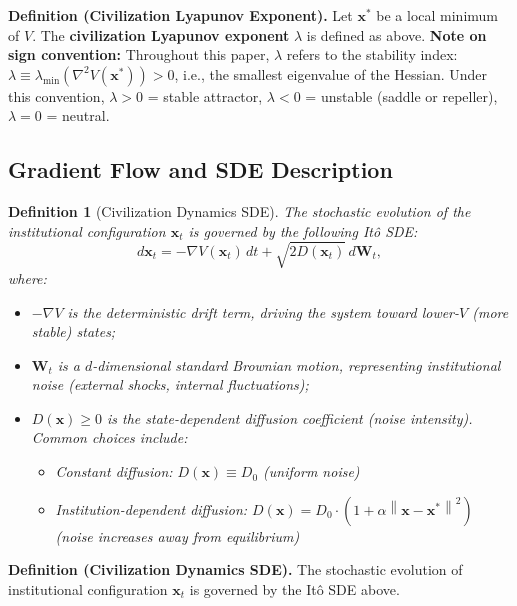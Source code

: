 \documentclass[12pt,a4paper]{article}
\newtheorem{definition}[theorem]{Definition}
\theoremstyle{definition}
\newcommand{\norm}[1]{\left\|#1\right\|}
\newcommand{\lb}{\lambda}
\newcommand{\lambdamin}{\lambda_{\min}}
\newcommand{\Lyap}{V}
\newcommand{\grad}{\nabla}
\begin{document}
\noindent
\textbf{Definition (Civilization Lyapunov Exponent).}
Let $\mathbf{x}^*$ be a local minimum of $\Lyap$. The \textbf{civilization Lyapunov exponent} $\lb$ is defined as above. \textbf{Note on sign convention:} Throughout this paper, $\lb$ refers to the stability index: $\lb \equiv \lambdamin(\nabla^2 \Lyap(\mathbf{x}^*)) > 0$, i.e., the smallest eigenvalue of the Hessian. Under this convention, $\lb > 0$ = stable attractor, $\lb < 0$ = unstable (saddle or repeller), $\lb = 0$ = neutral.

\subsection{Gradient Flow and SDE Description}
\label{sec:gradient_flow}

\begin{definition}[Civilization Dynamics SDE]
\label{def:sde}
The stochastic evolution of the institutional configuration $\mathbf{x}_t$ is governed by the following It\^{o} SDE:
\begin{equation}\label{eq:sde_main}
    d\mathbf{x}_t = -\grad \Lyap(\mathbf{x}_t) \, dt + \sqrt{2D(\mathbf{x}_t)} \, d\mathbf{W}_t,
\end{equation}
where:
\begin{itemize}
    \item $-\grad \Lyap$ is the deterministic drift term, driving the system toward lower-$\Lyap$ (more stable) states;
    \item $\mathbf{W}_t$ is a $d$-dimensional standard Brownian motion, representing institutional noise (external shocks, internal fluctuations);
    \item $D(\mathbf{x}) \geq 0$ is the state-dependent diffusion coefficient (noise intensity). Common choices include:
    \begin{itemize}
        \item Constant diffusion: $D(\mathbf{x}) \equiv D_0$ (uniform noise)
        \item Institution-dependent diffusion: $D(\mathbf{x}) = D_0 \cdot (1 + \alpha \norm{\mathbf{x} - \mathbf{x}^*}^2)$ (noise increases away from equilibrium)
    \end{itemize}
\end{itemize}
\end{definition}

\noindent
\textbf{Definition (Civilization Dynamics SDE).}
The stochastic evolution of institutional configuration $\mathbf{x}_t$ is governed by the It\^{o} SDE above.
\end{document}
